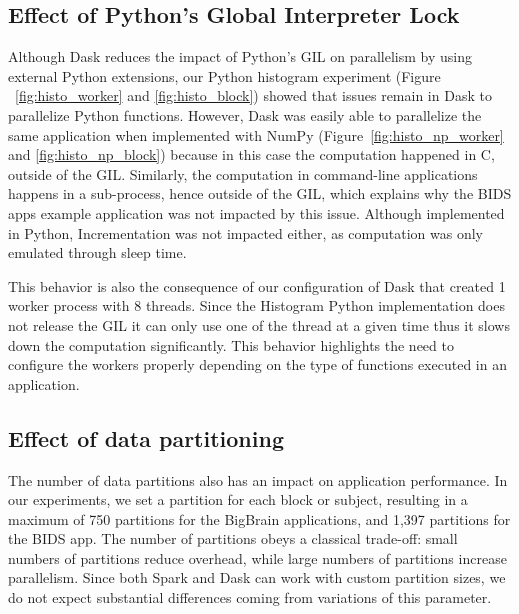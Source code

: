 \documentclass[conference]{IEEEtran}
\begin{document}
\subsection{Effect of Python's Global Interpreter Lock}

Although Dask reduces the impact of Python's GIL on parallelism by using external
Python extensions, our Python histogram experiment (Figure
~\ref{fig:histo_worker} and \ref{fig:histo_block}) showed that issues remain in Dask to
parallelize Python functions. However, Dask was easily able to parallelize
the same application when implemented with NumPy
(Figure~\ref{fig:histo_np_worker} and \ref{fig:histo_np_block}) because in this case the computation
happened in C, outside of the GIL. Similarly, the computation in
command-line applications happens in a sub-process, hence outside of the
GIL, which explains why the BIDS apps example application was not impacted
by this issue. Although implemented in Python, Incrementation was not
impacted either, as computation was only emulated through sleep time.

This behavior is also the consequence of our configuration of Dask that
created 1 worker process with 8 threads. Since the Histogram Python
implementation does not release the GIL it can only use one of the thread
at a given time thus it slows down the computation significantly. This
behavior highlights the need to configure the workers properly depending on
the type of functions executed in an application.

\subsection{Effect of data partitioning}

The number of data partitions also has an impact on application
performance. In our experiments, we set a partition for each block or
subject, resulting in a maximum of 750 partitions for the BigBrain
applications, and 1,397 partitions for the BIDS app. The number of
partitions obeys a classical trade-off: small numbers of partitions reduce 
overhead, while large numbers of
partitions increase parallelism. Since both Spark and Dask can
work with custom partition sizes, we do not expect substantial differences
coming from variations of this parameter.

\end{document}
